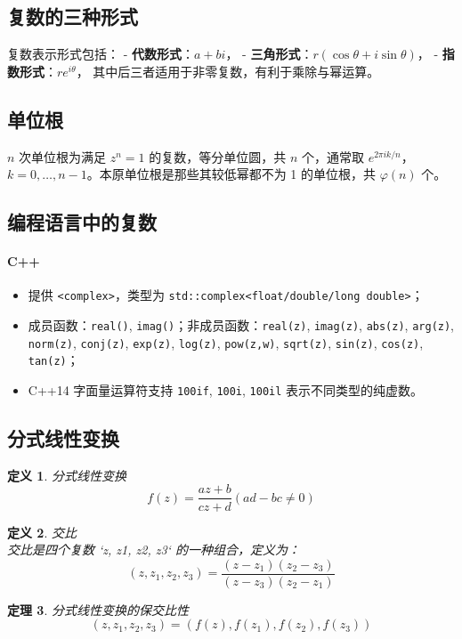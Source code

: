 \documentclass[12pt, a4paper, oneside]{ctexbook}
\newtheorem{theorem}{定理}[section]
\newtheorem{definition}[theorem]{定义}
\begin{document}
\subsection*{复数的三种形式}
复数表示形式包括：
- \textbf{代数形式}：$a + bi$，
- \textbf{三角形式}：$r(\cos\theta + i\sin\theta)$，
- \textbf{指数形式}：$re^{i\theta}$，
其中后三者适用于非零复数，有利于乘除与幂运算。

\subsection*{单位根}
$n$ 次单位根为满足 $z^n = 1$ 的复数，等分单位圆，共 $n$ 个，通常取 $e^{2\pi i k/n}$，$k=0,\dots,n-1$。本原单位根是那些其较低幂都不为 1 的单位根，共 $\varphi(n)$ 个。

\subsection*{编程语言中的复数}

\paragraph{C++}
\begin{itemize}
  \item 提供 \texttt{<complex>}，类型为 \texttt{std::complex<float/double/long double>}；
  \item 成员函数：\texttt{real()}, \texttt{imag()}；非成员函数：\texttt{real(z)}, \texttt{imag(z)}, \texttt{abs(z)}, \texttt{arg(z)}, \texttt{norm(z)}, \texttt{conj(z)}, \texttt{exp(z)}, \texttt{log(z)}, \texttt{pow(z,w)}, \texttt{sqrt(z)}, \texttt{sin(z)}, \texttt{cos(z)}, \texttt{tan(z)}；
  \item C++14 字面量运算符支持 \texttt{100if}, \texttt{100i}, \texttt{100il} 表示不同类型的纯虚数。
\end{itemize}


\subsection{分式线性变换}
\begin{definition}
  分式线性变换\\
$$
f(z)=\frac{az+b}{cz+d}  (ad-bc \neq 0)
$$
\end{definition}

\begin{definition}
  交比\\
  交比是四个复数 `z, z1, z2, z3` 的一种组合，定义为：
$$
(z,z_1,z_2,z_3)=\frac{(z-z_1)(z_2-z_3)}{(z-z_3)(z_2-z_1)}
$$
\end{definition}

\begin{theorem}
  分式线性变换的保交比性\\
  \[
  (z,z_1,z_2,z_3)=(f(z),f(z_1),f(z_2),f(z_3))
  \]
\end{theorem}
\end{document}
